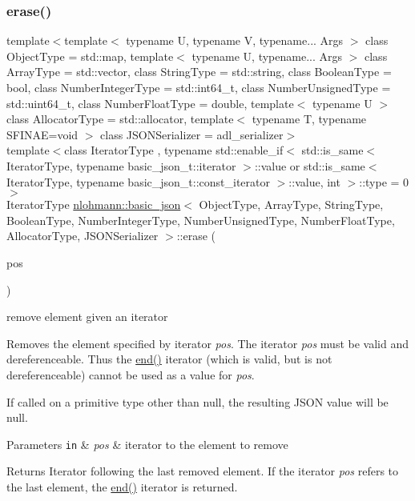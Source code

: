 \subsubsection{\texorpdfstring{erase()}{erase()}\hspace{0.1cm}{\footnotesize\ttfamily [1/4]}}
{\footnotesize\ttfamily template$<$template$<$ typename U, typename V, typename... Args $>$ class Object\+Type = std\+::map, template$<$ typename U, typename... Args $>$ class Array\+Type = std\+::vector, class String\+Type  = std\+::string, class Boolean\+Type  = bool, class Number\+Integer\+Type  = std\+::int64\+\_\+t, class Number\+Unsigned\+Type  = std\+::uint64\+\_\+t, class Number\+Float\+Type  = double, template$<$ typename U $>$ class Allocator\+Type = std\+::allocator, template$<$ typename T, typename S\+F\+I\+N\+A\+E=void $>$ class J\+S\+O\+N\+Serializer = adl\+\_\+serializer$>$ \\
template$<$class Iterator\+Type , typename std\+::enable\+\_\+if$<$ std\+::is\+\_\+same$<$ Iterator\+Type, typename basic\+\_\+json\+\_\+t\+::iterator $>$\+::value or std\+::is\+\_\+same$<$ Iterator\+Type, typename basic\+\_\+json\+\_\+t\+::const\+\_\+iterator $>$\+::value, int $>$\+::type  = 0$>$ \\
Iterator\+Type \mbox{\hyperlink{classnlohmann_1_1basic__json}{nlohmann\+::basic\+\_\+json}}$<$ Object\+Type, Array\+Type, String\+Type, Boolean\+Type, Number\+Integer\+Type, Number\+Unsigned\+Type, Number\+Float\+Type, Allocator\+Type, J\+S\+O\+N\+Serializer $>$\+::erase (\begin{DoxyParamCaption}\item[{Iterator\+Type}]{pos }\end{DoxyParamCaption})\hspace{0.3cm}{\ttfamily [inline]}}



remove element given an iterator 

Removes the element specified by iterator {\itshape pos}. The iterator {\itshape pos} must be valid and dereferenceable. Thus the {\ttfamily \mbox{\hyperlink{classnlohmann_1_1basic__json_a13e032a02a7fd8a93fdddc2fcbc4763c}{end()}}} iterator (which is valid, but is not dereferenceable) cannot be used as a value for {\itshape pos}.

If called on a primitive type other than {\ttfamily null}, the resulting J\+S\+ON value will be {\ttfamily null}.


\begin{DoxyParams}[1]{Parameters}
\mbox{\tt in}  & {\em pos} & iterator to the element to remove \\
\hline
\end{DoxyParams}
\begin{DoxyReturn}{Returns}
Iterator following the last removed element. If the iterator {\itshape pos} refers to the last element, the {\ttfamily \mbox{\hyperlink{classnlohmann_1_1basic__json_a13e032a02a7fd8a93fdddc2fcbc4763c}{end()}}} iterator is returned.
\end{DoxyReturn}

